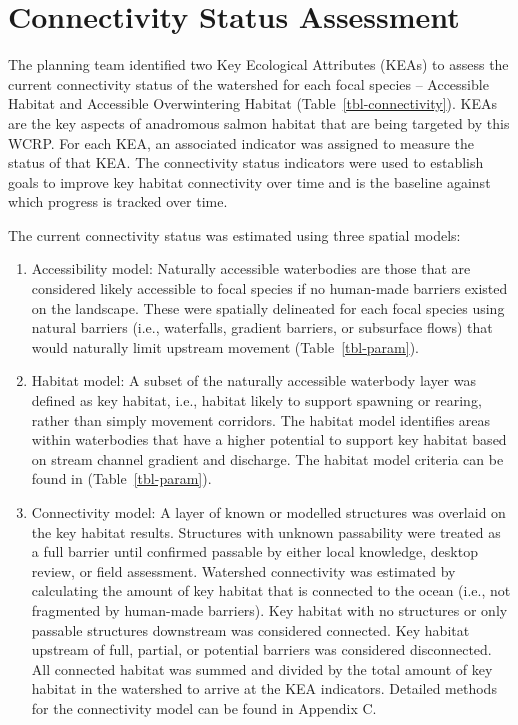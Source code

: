\documentclass[
  letterpaper,
  DIV=11,
  numbers=noendperiod]{scrreprt}
\begin{document}

\section*{Connectivity Status
Assessment}\label{connectivity-status-assessment}


The planning team identified two Key Ecological Attributes (KEAs) to
assess the current connectivity status of the watershed for each focal
species -- Accessible Habitat and Accessible Overwintering Habitat
(Table~\ref{tbl-connectivity}). KEAs are the key aspects of anadromous
salmon habitat that are being targeted by this WCRP. For each KEA, an
associated indicator was assigned to measure the status of that KEA. The
connectivity status indicators were used to establish goals to improve
key habitat connectivity over time and is the baseline against which
progress is tracked over time.

The current connectivity status was estimated using three spatial
models:

\begin{enumerate}
\def\labelenumi{\arabic{enumi}.}
\item
  Accessibility model: Naturally accessible waterbodies are those that
  are considered likely accessible to focal species if no human-made
  barriers existed on the landscape. These were spatially delineated for
  each focal species using natural barriers (i.e., waterfalls, gradient
  barriers, or subsurface flows) that would naturally limit upstream
  movement (Table~\ref{tbl-param}).
\item
  Habitat model: A subset of the naturally accessible waterbody layer
  was defined as key habitat, i.e., habitat likely to support spawning
  or rearing, rather than simply movement corridors. The habitat model
  identifies areas within waterbodies that have a higher potential to
  support key habitat based on stream channel gradient and discharge.
  The habitat model criteria can be found in (Table~\ref{tbl-param}).
\item
  Connectivity model: A layer of known or modelled structures was
  overlaid on the key habitat results. Structures with unknown
  passability were treated as a full barrier until confirmed passable by
  either local knowledge, desktop review, or field assessment. Watershed
  connectivity was estimated by calculating the amount of key habitat
  that is connected to the ocean (i.e., not fragmented by human-made
  barriers). Key habitat with no structures or only passable structures
  downstream was considered connected. Key habitat upstream of full,
  partial, or potential barriers was considered disconnected. All
  connected habitat was summed and divided by the total amount of key
  habitat in the watershed to arrive at the KEA indicators. Detailed
  methods for the connectivity model can be found in Appendix C.
\end{enumerate}
\end{document}
